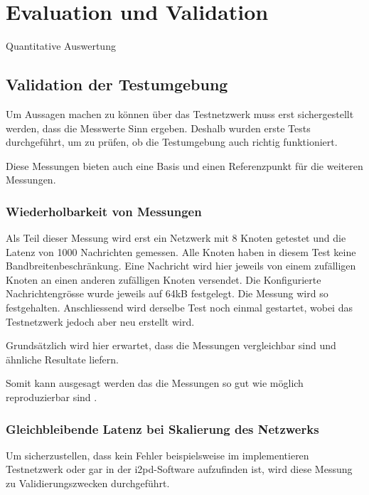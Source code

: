 \chapter{Evaluation und Validation}
\label{ch:Eval}


Quantitative Auswertung

\section{Validation der Testumgebung}

Um Aussagen machen zu können über das Testnetzwerk muss erst sichergestellt werden, dass die Messwerte Sinn ergeben.
Deshalb wurden erste Tests durchgeführt, um zu prüfen, ob die Testumgebung auch richtig funktioniert.

Diese Messungen bieten auch eine Basis und einen Referenzpunkt für die weiteren Messungen.

\subsection{Wiederholbarkeit von Messungen}

Als Teil dieser Messung wird erst ein Netzwerk mit 8 Knoten getestet und die Latenz von 1000 Nachrichten gemessen.
Alle Knoten haben in diesem Test keine Bandbreitenbeschränkung.
Eine Nachricht wird hier jeweils von einem zufälligen Knoten an einen anderen zufälligen Knoten versendet.
Die Konfigurierte Nachrichtengrösse wurde jeweils auf 64kB festgelegt.
Die Messung wird so festgehalten.
Anschliessend wird derselbe Test noch einmal gestartet, wobei das Testnetzwerk jedoch aber neu erstellt wird.

Grundsätzlich wird hier erwartet, dass die Messungen vergleichbar sind und ähnliche Resultate liefern.



Somit kann ausgesagt werden das die Messungen so gut wie möglich reproduzierbar sind .


\subsection{Gleichbleibende Latenz bei Skalierung des Netzwerks}

Um sicherzustellen, dass kein Fehler beispielsweise im implementieren Testnetzwerk oder gar in der i2pd-Software aufzufinden ist, wird diese Messung zu Validierungszwecken durchgeführt.

